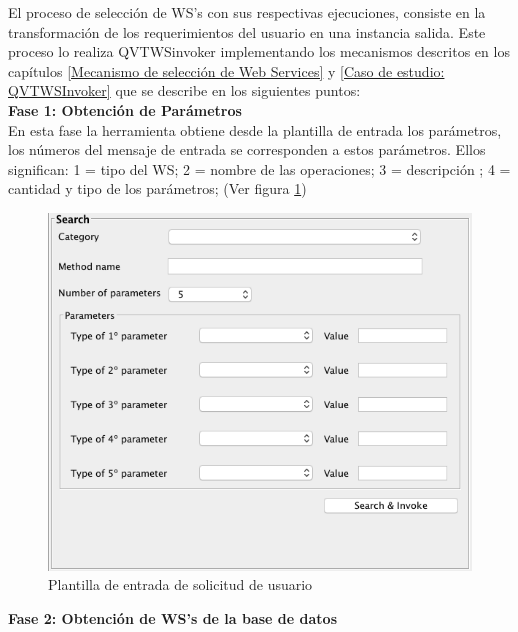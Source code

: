El proceso de selección de WS's con sus respectivas ejecuciones, consiste en la transformación de los requerimientos del usuario en una instancia salida. Este proceso lo realiza QVTWSinvoker implementando los mecanismos descritos en los capítulos \ref{Mecanismo de selección de Web Services} y \ref{Caso de estudio: QVTWSInvoker} que se describe en los siguientes puntos:\\

\textbf{Fase 1: Obtención de Parámetros}\\

En esta fase la herramienta obtiene desde la plantilla de entrada los parámetros, los números del mensaje de entrada se corresponden a estos parámetros. Ellos significan: 1 = tipo del WS; 2 = nombre de las operaciones; 3 = descripción ; 4 = cantidad y tipo de los parámetros; (Ver figura \ref{fig:Plantilla de entrada de solicitud de usuario})\\

\begin{figure}[!h] 
	\begin{center}
		\includegraphics [scale=0.60]{imagenes/Plantilla_de_entrada_de_solicitud_de_usuario.png}
	\end{center}
	\caption{Plantilla de entrada de solicitud de usuario}
	\label{fig:Plantilla de entrada de solicitud de usuario}
\end{figure} 

\textbf{Fase 2: Obtención de WS's de la base de datos}\\

